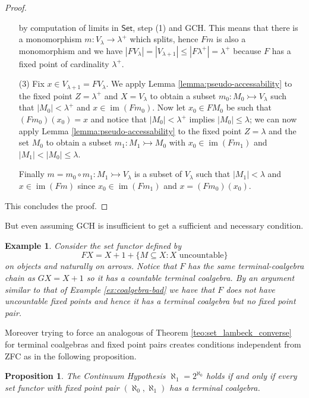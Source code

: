 \documentclass[letterpaper, 11pt, oneside]{memoir}
\theoremstyle{myteo}
\newtheorem{proposition}[theorem]{Proposition}
\newtheorem{example}[theorem]{Example}
\numberwithin{equation}{section}
\newcommand{\Set}{\textsf{Set}}
\DeclareMathOperator{\im}{im}
\begin{document}
\begin{proof}
\begin{itemize}
\begin{equation*}
    \end{equation*}
    by computation of limits in \(\Set\), step (1) and GCH.
    This means that there is a monomorphism \(m : V_\lambda \to \lambda^+\) which splits, hence \(Fm\) is also a monomorphism and we have \(|FV_\lambda| = |V_{\lambda + 1}| \leq |F\lambda^+| = \lambda^+\) because \(F\) has a fixed point of cardinality \(\lambda^+\).
  \item[(3)]
    Fix \(x \in V_{\lambda + 1} = FV_\lambda\).
    We apply Lemma \ref{lemma:pseudo-accessability} to the fixed point \(Z = \lambda^+\) and \(X = V_\lambda\) to obtain a subset \(m_0 : M_0 \rightarrowtail V_\lambda\) such that \(|M_0| < \lambda^+\) and \(x \in \im(Fm_0)\).
    Now let \(x_0 \in FM_0\) be such that \((Fm_0)(x_0) = x\) and notice that \(|M_0| < \lambda^+\) implies \(|M_0| \leq \lambda\); we can now apply Lemma \ref{lemma:pseudo-accessability} to the fixed point \(Z = \lambda\) and the set \(M_0\) to obtain a subset \(m_1: M_1 \rightarrowtail M_0\) with \(x_0 \in \im(Fm_1)\) and \(|M_1| < |M_0| \leq \lambda\).

    Finally \(m = m_0 \circ m_1 : M_1 \rightarrowtail V_\lambda\) is a subset of \(V_\lambda\) such that \(|M_1| < \lambda\) and \(x \in \im(Fm)\) since \(x_0 \in \im(Fm_1)\) and \(x = (Fm_0)(x_0)\).
  \end{itemize}
  This concludes the proof.
\end{proof}

But even assuming GCH is insufficient to get a sufficient and necessary condition.

\begin{example}
  Consider the set functor defined by
  \begin{equation*}
    FX = X + 1 + \{M \subseteq X : \text{\(X\) uncountable}\}
  \end{equation*}
  on objects and naturally on arrows.
  Notice that \(F\) has the same terminal-coalgebra chain as \(GX = X + 1\) so it has a countable terminal coalgebra.
  By an argument similar to that of Example \ref{ex:coalgebra-bad} we have that \(F\) does not have uncountable fixed points and hence it has a terminal coalgebra but no fixed point pair.
\end{example}

Moreover trying to force an analogous of Theorem \ref{teo:set_lambeck_converse} for terminal coalgebras and fixed point pairs creates conditions independent from ZFC as in the following proposition.

\begin{proposition}
  The Continuum Hypothesis \(\aleph_1 = 2^{\aleph_0}\) holds if and only if every set functor with fixed point pair \((\aleph_0, \aleph_1)\) has a terminal coalgebra.
\end{proposition}
\end{document}

